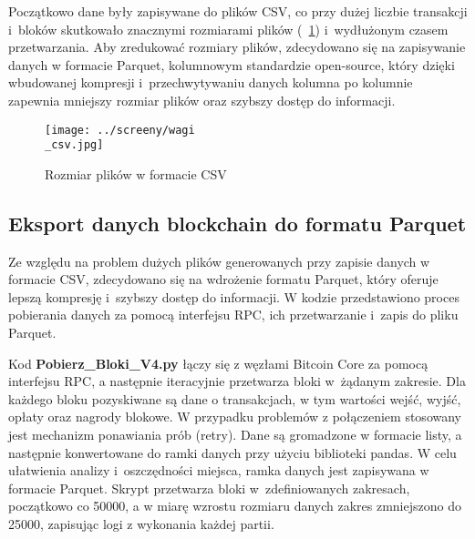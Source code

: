 \documentclass[12pt,a4paper]{report}
\theoremstyle{definition} %
\begin{document}
Początkowo dane były zapisywane do plików CSV, co przy dużej liczbie transakcji i~bloków skutkowało znacznymi rozmiarami plików (\figurename~\ref{fig:rozmiarCSV}) i~wydłużonym czasem przetwarzania. Aby zredukować rozmiary plików, zdecydowano się na zapisywanie danych w formacie Parquet, kolumnowym standardzie open-source, który dzięki wbudowanej kompresji i~przechwytywaniu danych kolumna po kolumnie zapewnia mniejszy rozmiar plików oraz szybszy dostęp do informacji.

	\begin{figure}[H]
	    \centering
	    \texttt{[image: ../screeny/wagi\\\_csv.jpg]} 
	    \caption{Rozmiar plików w formacie CSV}
	    \label{fig:rozmiarCSV}
	\end{figure}

	\subsection{Eksport danych blockchain do formatu Parquet}
	\hspace*{\parindent}Ze względu na problem dużych plików generowanych przy zapisie danych w formacie CSV, zdecydowano się na wdrożenie formatu Parquet, który oferuje lepszą kompresję i~szybszy dostęp do informacji. W kodzie przedstawiono proces pobierania danych za pomocą interfejsu RPC, ich przetwarzanie i~zapis do pliku Parquet.

	Kod \textbf{Pobierz\_Bloki\_V4.py} łączy się z węzłami Bitcoin Core za pomocą interfejsu RPC, a następnie iteracyjnie przetwarza bloki w~żądanym zakresie. Dla każdego bloku pozyskiwane są dane o transakcjach, w tym wartości wejść, wyjść, opłaty oraz nagrody blokowe. W przypadku problemów z połączeniem stosowany jest mechanizm ponawiania prób 		(retry). Dane są gromadzone w formacie listy, a następnie konwertowane do ramki danych przy użyciu biblioteki pandas. W celu ułatwienia analizy i~oszczędności miejsca, ramka danych jest zapisywana w formacie Parquet. Skrypt przetwarza bloki w~zdefiniowanych zakresach, początkowo co 50000, a w miarę wzrostu rozmiaru danych zakres zmniejszono 	do 25000, zapisując logi z wykonania każdej partii.
\end{document}

